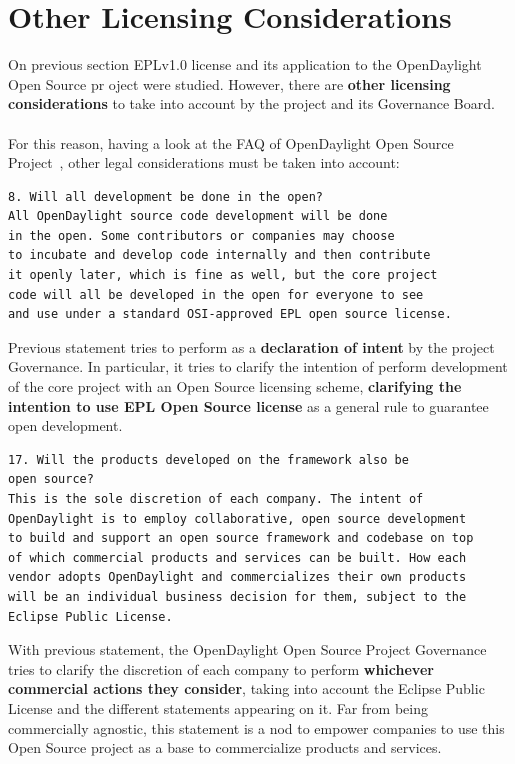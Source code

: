\documentclass[a4paper, 12pt]{book}
\begin{document}
\section{Other Licensing Considerations}
\label{sec:otherlicenseconsiderations}

On previous section EPLv1.0 license and its application to the OpenDaylight Open Source pr oject were studied. However, there are \textbf{other licensing considerations} to take into account by the project and its Governance Board.\\
\\
For this reason, having a look at the FAQ of OpenDaylight Open Source Project~\cite{OpenDaylightFAQ}, other legal considerations must be taken into account:

\begin{verbatim}
8. Will all development be done in the open?
All OpenDaylight source code development will be done
in the open. Some contributors or companies may choose
to incubate and develop code internally and then contribute
it openly later, which is fine as well, but the core project
code will all be developed in the open for everyone to see
and use under a standard OSI-approved EPL open source license.
\end{verbatim}
Previous statement tries to perform as a \textbf{declaration of intent} by the project Governance. In particular, it tries to clarify the intention of perform development of the core project with an Open Source licensing scheme, \textbf{clarifying the intention to use EPL Open Source license} as a general rule to guarantee open development.

\begin{verbatim}
17. Will the products developed on the framework also be
open source?
This is the sole discretion of each company. The intent of
OpenDaylight is to employ collaborative, open source development
to build and support an open source framework and codebase on top
of which commercial products and services can be built. How each
vendor adopts OpenDaylight and commercializes their own products
will be an individual business decision for them, subject to the
Eclipse Public License.
\end{verbatim}
With previous statement, the OpenDaylight Open Source Project Governance tries to clarify the discretion of each company to perform \textbf{whichever commercial actions they consider}, taking into account the Eclipse Public License and the different statements appearing on it. Far from being commercially agnostic, this statement is a nod to empower companies to use this Open Source project as a base to commercialize products and services.
\end{document}
